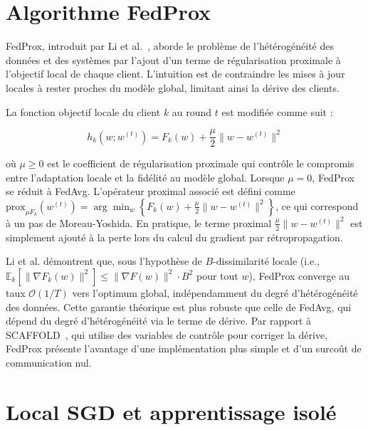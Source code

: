 \documentclass[12pt,a4paper]{report}
\begin{document}
\section{Algorithme FedProx}

FedProx, introduit par Li et al.~\cite{li2020fedprox}, aborde le probl\`{e}me de l'h\'{e}t\'{e}rog\'{e}n\'{e}it\'{e} des donn\'{e}es et des syst\`{e}mes par l'ajout d'un terme de r\'{e}gularisation proximale \`{a} l'objectif local de chaque client. L'intuition est de contraindre les mises \`{a} jour locales \`{a} rester proches du mod\`{e}le global, limitant ainsi la d\'{e}rive des clients.

La fonction objectif locale du client $k$ au round $t$ est modifi\'{e}e comme suit :

\begin{equation}
h_k(w; w^{(t)}) = F_k(w) + \frac{\mu}{2} \|w - w^{(t)}\|^2
\label{eq:fedprox_loss}
\end{equation}

o\`{u} $\mu \geq 0$ est le coefficient de r\'{e}gularisation proximale qui contr\^{o}le le compromis entre l'adaptation locale et la fid\'{e}lit\'{e} au mod\`{e}le global. Lorsque $\mu = 0$, FedProx se r\'{e}duit \`{a} FedAvg. L'op\'{e}rateur proximal associ\'{e} est d\'{e}fini comme $\text{prox}_{\mu F_k}(w^{(t)}) = \arg\min_w \left\{ F_k(w) + \frac{\mu}{2}\|w - w^{(t)}\|^2 \right\}$, ce qui correspond \`{a} un pas de Moreau-Yoshida. En pratique, le terme proximal $\frac{\mu}{2}\|w - w^{(t)}\|^2$ est simplement ajout\'{e} \`{a} la perte lors du calcul du gradient par r\'{e}tropropagation.

Li et al. d\'{e}montrent que, sous l'hypoth\`{e}se de $B$-dissimilarit\'{e} locale (i.e., $\mathbb{E}_k[\|\nabla F_k(w)\|^2] \leq \|\nabla F(w)\|^2 \cdot B^2$ pour tout $w$), FedProx converge au taux $\mathcal{O}(1/T)$ vers l'optimum global, ind\'{e}pendamment du degr\'{e} d'h\'{e}t\'{e}rog\'{e}n\'{e}it\'{e} des donn\'{e}es. Cette garantie th\'{e}orique est plus robuste que celle de FedAvg, qui d\'{e}pend du degr\'{e} d'h\'{e}t\'{e}rog\'{e}n\'{e}it\'{e} via le terme de d\'{e}rive. Par rapport \`{a} SCAFFOLD~\cite{kairouz2021}, qui utilise des variables de contr\^{o}le pour corriger la d\'{e}rive, FedProx pr\'{e}sente l'avantage d'une impl\'{e}mentation plus simple et d'un surco\^{u}t de communication nul.

\section{Local SGD et apprentissage isol\'{e}}
\end{document}
